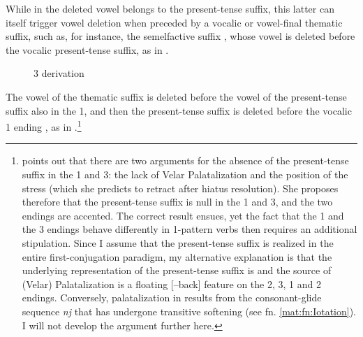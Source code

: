 \documentclass[output=paper,colorlinks,citecolor=black,koreanfont]{langscibook}
\begin{document}
\noindent While in  the deleted vowel belongs to the present-tense suffix, this latter can itself trigger vowel deletion when preceded by a vocalic or vowel-final thematic suffix, such as, for instance, the semelfactive suffix , whose vowel is deleted before the vocalic present-tense suffix, as in .

\begin{figure}
    \caption{{3\SG} derivation}
    \label{mat:fig:derivation-stomp-3sg}
\end{figure}

The vowel of the thematic suffix is deleted before the vowel of the present-tense suffix also in the {1\SG}, and then the present-tense suffix is deleted before the vocalic {1\SG} ending , as in .\footnote{\label{mat:fn:Null}\citet[83--86]{Melvold1989} points out that there are two arguments for the absence of the present-tense suffix  in the {1\SG} and {3\PL}: the lack of Velar Palatalization and the position of the stress (which she predicts to retract after hiatus resolution). She proposes therefore that the present-tense suffix is null in the {1\SG} and {3\PL}, and the two endings are accented. The correct result ensues, yet the fact that the {1\SG} and the {3\PL} endings behave differently in {1\SG}-pattern verbs then requires an additional stipulation. Since I assume that the present-tense suffix is realized in the entire first-conjugation paradigm, my alternative explanation is that the underlying representation of the present-tense suffix is  and the source of (Velar) Palatalization is a floating [$–$back] feature on the {2\SG}, {3\SG}, {1\PL} and {2\PL} endings. Conversely, palatalization in  results from the consonant-glide sequence \textit{nj} that has undergone transitive softening (see fn. \ref{mat:fn:Iotation}). I will not develop the argument further here.}
\end{document}
